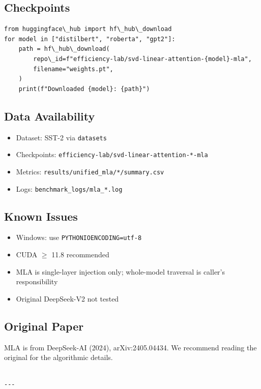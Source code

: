 \subsection{Checkpoints}

\begin{lstlisting}
from huggingface\_hub import hf\_hub\_download
for model in ["distilbert", "roberta", "gpt2"]:
    path = hf\_hub\_download(
        repo\_id=f"efficiency-lab/svd-linear-attention-{model}-mla",
        filename="weights.pt",
    )
    print(f"Downloaded {model}: {path}")
\end{lstlisting}

\subsection{Data Availability}

\begin{itemize}
\item Dataset: SST-2 via \texttt{datasets}
\item Checkpoints: \texttt{efficiency-lab/svd-linear-attention-*-mla}
\item Metrics: \texttt{results/unified\_mla/*/summary.csv}
\item Logs: \texttt{benchmark\_logs/mla\_*.log}

\end{itemize}
\subsection{Known Issues}

\begin{itemize}
\item Windows: use \texttt{PYTHONIOENCODING=utf-8}
\item CUDA $\ge$ 11.8 recommended
\item MLA is single-layer injection only; whole-model traversal is caller's
  responsibility
\item Original DeepSeek-V2 not tested

\end{itemize}
\subsection{Original Paper}

MLA is from DeepSeek-AI (2024), arXiv:2405.04434. We recommend reading 
the original for the algorithmic details.
\begin{lstlisting}

---
\end{lstlisting}

